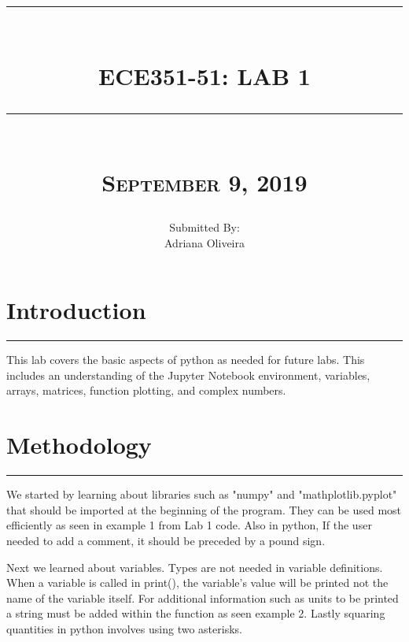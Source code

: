 \documentclass[12pt]{report}
\newcommand{\HRule}[1]{\rule{\linewidth}{#1}}
\begin{document}
\title{ 
		\\ [2.0cm]
		\HRule{0.5pt} \\
		\LARGE \textbf{\uppercase{ECE351-51: Lab 1}} 
		\HRule{2pt} \\ [0.5cm]
		\normalsize\textsc{September 9, 2019} \vspace*{5\baselineskip}}

\date{}
\author{\normalsize
		Submitted By: \\
		\normalsize Adriana Oliveira\\}

\maketitle

\newpage

\sectionfont{\scshape}

\section*{Introduction}
\hrule
\vspace{1cm}
\setlength{\parindent}{5ex}
This lab covers the basic aspects of python as needed for future labs. This includes an understanding of the Jupyter Notebook environment, variables, arrays, matrices, function plotting, and complex numbers. \par


\section*{Methodology}
\hrule
\vspace{1cm}
\setlength{\parindent}{5ex}
We started by learning about libraries such as "numpy" and "mathplotlib.pyplot" that should be imported at the beginning of the program. They can be used most efficiently as seen in example 1 from Lab 1 code. Also in python, If the user needed to add a comment, it should be preceded by a pound sign.\par

Next we learned about variables. Types are not needed in variable definitions. When a variable is called in print(), the variable's value will be printed not the name of the variable itself. For additional information such as units to be printed a string must be added within the function as seen example 2. Lastly squaring quantities in python involves using two asterisks.\par
\end{document}
